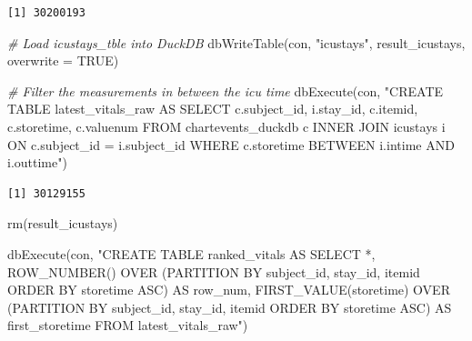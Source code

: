 \documentclass[
]{article}
\newenvironment{Shaded}{\begin{snugshade}}{\end{snugshade}}
\newcommand{\AttributeTok}[1]{\textcolor[rgb]{0.77,0.63,0.00}{#1}}
\newcommand{\CommentTok}[1]{\textcolor[rgb]{0.56,0.35,0.01}{\textit{#1}}}
\newcommand{\ConstantTok}[1]{\textcolor[rgb]{0.00,0.00,0.00}{#1}}
\newcommand{\FunctionTok}[1]{\textcolor[rgb]{0.00,0.00,0.00}{#1}}
\newcommand{\NormalTok}[1]{\textcolor[rgb]{0.00,0.00,0.00}{#1}}
\newcommand{\StringTok}[1]{\textcolor[rgb]{0.31,0.60,0.02}{#1}}
\begin{document}
\begin{verbatim}
[1] 30200193
\end{verbatim}

\begin{Shaded}
\begin{Highlighting}[]
\CommentTok{\#  Load \textasciigrave{}icustays\_tble\textasciigrave{} into DuckDB}
\FunctionTok{dbWriteTable}\NormalTok{(con, }\StringTok{"icustays"}\NormalTok{, result\_icustays, }\AttributeTok{overwrite =} \ConstantTok{TRUE}\NormalTok{)}
\end{Highlighting}
\end{Shaded}

\begin{Shaded}
\begin{Highlighting}[]
\CommentTok{\# Filter the measurements in between the icu time}
\FunctionTok{dbExecute}\NormalTok{(con, }\StringTok{"CREATE TABLE latest\_vitals\_raw AS }
\StringTok{                SELECT c.subject\_id, i.stay\_id, }
\StringTok{                c.itemid, c.storetime, c.valuenum}
\StringTok{                FROM chartevents\_duckdb c}
\StringTok{                INNER JOIN icustays i }
\StringTok{                ON c.subject\_id = i.subject\_id}
\StringTok{                WHERE c.storetime BETWEEN i.intime AND i.outtime"}\NormalTok{)}
\end{Highlighting}
\end{Shaded}

\begin{verbatim}
[1] 30129155
\end{verbatim}

\begin{Shaded}
\begin{Highlighting}[]
\FunctionTok{rm}\NormalTok{(result\_icustays)}
\end{Highlighting}
\end{Shaded}

\begin{Shaded}
\begin{Highlighting}[]
\FunctionTok{dbExecute}\NormalTok{(con, }\StringTok{"CREATE TABLE ranked\_vitals AS }
\StringTok{        SELECT *, }
\StringTok{        ROW\_NUMBER() OVER (PARTITION BY subject\_id, stay\_id, }
\StringTok{        itemid ORDER BY storetime ASC) AS row\_num,}
\StringTok{        FIRST\_VALUE(storetime) OVER (PARTITION BY subject\_id, stay\_id, }
\StringTok{        itemid ORDER BY storetime ASC) AS first\_storetime}
\StringTok{        FROM latest\_vitals\_raw"}\NormalTok{)}
\end{Highlighting}
\end{Shaded}
\end{document}
